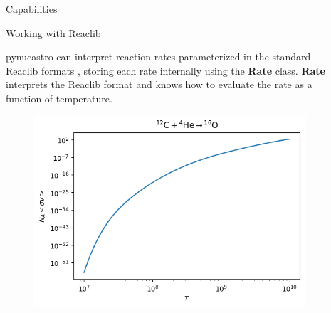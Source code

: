 \documentclass[final]{beamer}
\newlength{\sepwid}
\newlength{\onecolwid}
\newlength{\twocolwid}
\newcommand{\isotm}[2]{{}^{#2}\mathrm{#1}}
\begin{document}
\begin{frame}[t]
\begin{columns}[t]
\begin{column}{\onecolwid}
\begin{block}{Capabilities}
\end{block}


\begin{block}{Working with Reaclib}

pynucastro can interpret reaction rates parameterized in the standard
Reaclib formats \cite{Reaclib.2010}, storing each rate internally
using the \textbf{Rate} class. \textbf{Rate} interprets the Reaclib
format and knows how to evaluate the rate as a function of
temperature.

\begin{figure}
\includegraphics[width=\linewidth]{figures/library-examples-filtering_cago.png}
\end{figure}

\end{block}

\end{column} %

\begin{column}{\sepwid}\end{column} %

\begin{column}{\twocolwid} %


\end{column}
\end{columns}
\end{frame}
\end{document}
